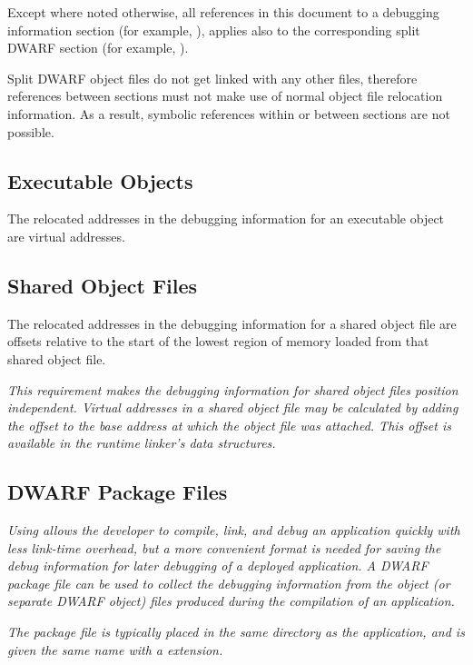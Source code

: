 Except where noted otherwise, all references in this document
to a debugging information section (for example, \dotdebuginfo),
applies also to the corresponding split DWARF section (for example,
\dotdebuginfodwo).

Split DWARF object files do not get linked with any other files,
therefore references between sections must not make use of
normal object file relocation information. As a result, symbolic
references within or between sections are not possible.

\subsection{Executable Objects}
\label{chap:executableobjects}
The relocated addresses in the debugging information for an
executable object are virtual addresses.

\subsection{Shared Object Files}
\label{datarep:sharedobject Files}
The relocated
addresses in the debugging information for a shared object file
are offsets relative to the start of the lowest region of
memory loaded from that shared object file.

\textit{This requirement makes the debugging information for
shared object files position independent.  Virtual addresses in a
shared object file may be calculated by adding the offset to the
base address at which the object file was attached. This offset
is available in the run\dash time linker\textquoteright s data structures.}

\subsection{DWARF Package Files}
\label{datarep:dwarfpackagefiles}
\textit{Using  allows the developer to compile, 
link, and debug an application quickly with less link-time overhead,
but a more convenient format is needed for saving the debug
information for later debugging of a deployed application. A
DWARF package file can be used to collect the debugging
information from the object (or separate DWARF object) files
produced during the compilation of an application.}

\textit{The package file is typically placed in the same directory as the
application, and is given the same name with a 
extension.}

